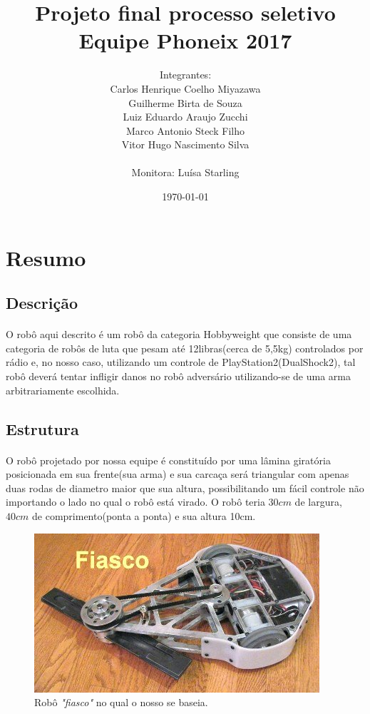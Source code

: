 \documentclass{article}
\title{Projeto final processo seletivo Equipe Phoneix 2017}
\author{
    Integrantes:\\
    Carlos Henrique Coelho Miyazawa\\
    Guilherme Birta de Souza\\
    Luiz Eduardo Araujo Zucchi\\
    Marco Antonio Steck Filho\\
    Vitor Hugo Nascimento Silva\\
    \\
    Monitora: Luísa Starling
}
\date{\today}
\begin{document}
    \maketitle
    \newpage
    \tableofcontents
    \newpage

    \section{Resumo}
        \subsection{Descrição}
        \paragraph{}
        O robô aqui descrito é um robô da categoria Hobbyweight que consiste de uma categoria de robôs de luta que pesam até 12libras(cerca de 5,5kg) controlados por rádio e, no nosso caso, utilizando um controle de PlayStation2(DualShock2), tal robô deverá tentar infligir danos no robô adversário utilizando-se de uma arma arbitrariamente escolhida.

        \subsection{Estrutura}
        \paragraph{}
        O robô projetado por nossa equipe é constituído por uma lâmina giratória posicionada em sua frente(sua arma) e
        sua carcaça será triangular com apenas duas rodas de diametro maior que sua altura, possibilitando um fácil
        controle não importando o lado no qual o robô está virado. O robô teria $30cm$ de largura, $40cm$ de
        comprimento(ponta a ponta) e sua altura 10cm.

        \begin{figure}[H]
        \includegraphics[width=\textwidth]{images/image05.jpg}
        \caption{Robô \textit{"fiasco"} no qual o nosso se baseia.}
        \centering
        \end{figure}
\end{document}

